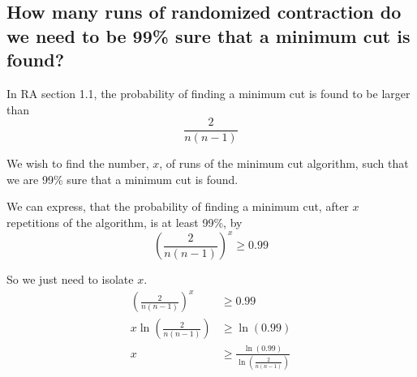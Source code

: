 \subsection*{How many runs of randomized contraction do we need to be 99\% sure that a minimum cut is found?}

In RA section 1.1, the probability of finding a minimum cut is found to be larger than
$$
\frac{2}{n(n-1)}
$$

We wish to find the number, $x$, of runs of the minimum cut algorithm, such that we are 99\% sure that a minimum cut is found.

We can express, that the probability of finding a minimum cut, after $x$ repetitions of the algorithm, is at least 99\%, by
$$
\left(\frac{2}{n(n-1)}\right)^x \geq 0.99
$$

So we just need to isolate $x$.
$$
\begin{aligned}
\left(\frac{2}{n(n-1)}\right) ^x & \geq 0.99
\\
x\ln\left(\frac{2}{n(n-1)}\right) & \geq \ln(0.99)
\\
x & \geq \frac{\ln(0.99)}{\ln\left(\frac{2}{n(n-1)}\right)}
\end{aligned}
$$